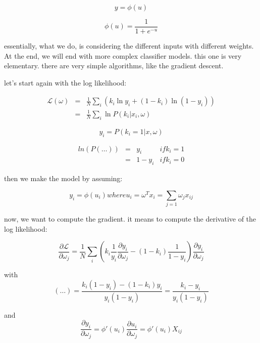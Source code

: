 \documentclass[a4paper]{tufte-book}
\begin{document}
\begin{equation}
    y = \phi (u)
\end{equation}

\begin{equation}
    \phi (u) = \frac{1}{1+e^{-u}}
\end{equation}

essentially, what we do, is considering the different inputs with different
weights.
At the end, we will end with more complex classifier models. this one is very
elementary.
there are very simple algorithms, like the gradient descent.


let's start again with the log likelihood:

\begin{eqnarray}
    \mathcal{L}(\omega) & = & \frac{1}{N} \sum_i (k_i \ln y_i + (1-k_i) \ln(1-y_i))\\
    & = & \frac{1}{N} \sum_i \ln P (k_i | x_i,\omega)
\end{eqnarray}

\begin{equation}
    y_i = P(k_i =1 |x,\omega)
\end{equation}

\begin{eqnarray}
    ln(P(\ldots)) & = & y_i & if k_i = 1 \\
    & = & 1-y_i & if k_i = 0
\end{eqnarray}

then we make the model by assuming:

\begin{equation}
    y_i = \phi (u_i) where u_i = \omega^T x_i = \sum_{j=1} \omega_j x_{ij}
\end{equation}

now, we want to compute the gradient.
it means to compute the derivative of the log likelihood:

\begin{equation}
    \frac{\partial \mathcal{L}}{\partial \omega_j} = \frac{1}{N} \sum_i (k_i \frac{1}{y_i} \frac{\partial y_i}{\partial\omega_j} - (1-k_i)
\frac{1}{1-y_i}) \frac{\partial y_i}{\partial \omega_j}
\end{equation}

with
\begin{equation}
    (\ldots) = \frac{ k_i (1-y_i) - (1-k_i)y_i}{y_i (1-y_i)} = \frac{k_i - y_i}{y_i (1-y_i)} 
\end{equation}


and \begin{equation}
    \frac{\partial y_i}{\partial \omega_j} = \phi'(u_i) \frac{\partial u_i}{\partial \omega_j} = \phi'(u_i) X_{ij}
\end{equation}
\end{document}
